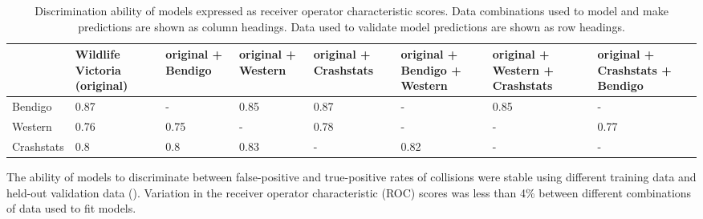 \begin{table}[htp]
\caption{Discrimination ability of models expressed as receiver operator characteristic scores. Data combinations used to model and make predictions are shown as column headings. Data used to validate model predictions are shown as row headings.}
\begin{tabularx}{\textwidth}{YYYYYYYY} \toprule
	& Wildlife Victoria
(original) & original + Bendigo & original + Western & original + Crashstats & original + Bendigo + Western & original + Western + Crashstats & original + Crashstats + Bendigo \\ 
  \midrule
Bendigo & 0.87 & - & 0.85 & 0.87 & - & 0.85 & - \\ 
Western & 0.76 & 0.75 & - & 0.78 & - & - & 0.77 \\ 
Crashstats & 0.8 & 0.8 & 0.83 & - & 0.82 & - & - \\
\bottomrule
\end{tabularx}
\label{val_glm_roc}
\end{table}

The ability of models to discriminate between false-positive and true-positive rates of collisions were stable using different training data and held-out validation data (). Variation in the receiver operator characteristic (ROC) scores was less than 4\% between different combinations of data used to fit models.

